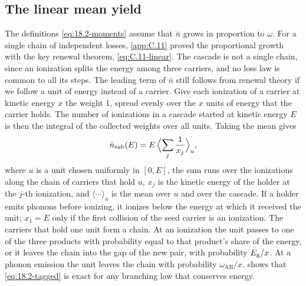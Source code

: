 \subsection{The linear mean yield}\label{sec:18.2-linear}

The definitions \cref{eq:18.2-moments} assume that $\bar n$ grows in proportion to $\omega$. For a single chain of independent losses, \cref{app:C.11} proved the proportional growth with the key renewal theorem, \cref{eq:C.11-linear}. The cascade is not a single chain, since an ionization splits the energy among three carriers, and no loss law is common to all its steps. The leading term of $\bar n$ still follows from renewal theory if we follow a unit of energy instead of a carrier. Give each ionization of a carrier at kinetic energy $x$ the weight 1, spread evenly over the $x$ units of energy that the carrier holds. The number of ionizations in a cascade started at kinetic energy $E$ is then the integral of the collected weights over all units. Taking the mean gives
\begin{equation}
  \bar n_{\mathrm{sub}}(E) = E\,\Bigl\langle\sum_j\frac{1}{x_j}\Bigr\rangle_u ,
  \label{eq:18.2-tagged}
\end{equation}
where $u$ is a unit chosen uniformly in $[0, E]$, the sum runs over the ionizations along the chain of carriers that hold $u$, $x_j$ is the kinetic energy of the holder at the $j$-th ionization, and $\langle\cdots\rangle_u$ is the mean over $u$ and over the cascade. If a holder emits phonons before ionizing, it ionizes below the energy at which it received the unit; $x_1 = E$ only if the first collision of the seed carrier is an ionization. The carriers that hold one unit form a chain. At an ionization the unit passes to one of the three products with probability equal to that product's share of the energy, or it leaves the chain into the gap of the new pair, with probability $E_{\mathrm{g}}/x$. At a phonon emission the unit leaves the chain with probability $\omega_{\mathrm{AB}}/x$.  shows that \cref{eq:18.2-tagged} is exact for any branching law that conserves energy.

